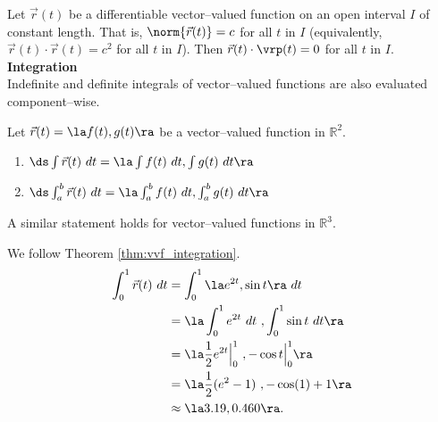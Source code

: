 {Let $\vec r(t)$ be a differentiable vector--valued function on an open interval $I$ of constant length. That is, $\norm{\vec r(t)} = c$ for all $t$ in $I$ (equivalently, $\vec r(t)\cdot \vec r(t) = c^2$ for all $t$ in $I$). 
Then $\vec r(t)\cdot\vrp(t) = 0$ for all $t$ in $I$.
}\\

\noindent\textbf{\large Integration}\\

Indefinite and definite integrals of vector--valued functions are also evaluated component--wise.

{Let $\vec r(t) = \la f(t),g(t)\ra$ be a vector--valued function in $\mathbb{R}^2$.
\begin{enumerate}
	\item $\ds \int \vec r(t)\ dt = \la \int f(t)\ dt, \int g(t)\ dt\ra$
	\item	$\ds \int_a^b \vec r(t)\ dt = \la \int_a^b f(t)\ dt, \int_a^b g(t)\ dt\ra$
\end{enumerate}
A similar statement holds for vector--valued functions in $\mathbb{R}^3$.
}

{We follow Theorem \ref{thm:vvf_integration}.
\begin{align*}
\int_0^1 \vec r(t) \ dt &= \int_0^1 \la e^{2t},\sin t\ra \ dt \\
				&= \la \int_0^1 e^{2t}\ dt\ , \int_0^1 \sin t \ dt \ra \\
				&= \la \frac12e^{2t}\Big|_0^1\ , -\cos t\Big|_0^1\ra \\
				&= \la \frac12(e^2-1)\ , -\cos(1)+1\ra\\
				&\approx \la 3.19,0.460\ra.
\end{align*}
\baselineskip
}\\

